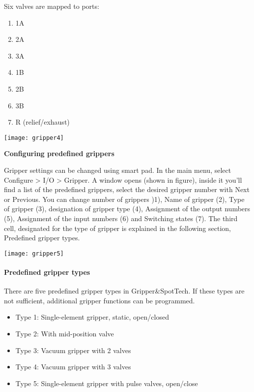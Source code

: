 	Six valves are mapped to ports:
 	\newline
 		\begin{minipage}{0.5\textwidth}
 			\begin{enumerate}
 				\item 1A
 				\item 2A
 				\item 3A
 				\item 1B
 				\item 2B
 				\item 3B
 				\item R (relief/exhaust) 
 			\end{enumerate}	
 	\end{minipage} \hfill
 	\begin{minipage}{0.5\textwidth}
 			\texttt{[image: gripper4]}
 	\end{minipage}
 
 	\newpage
	\textbf{Configuring predefined grippers}

	\bigskip

	\begin{minipage}{0.5\textwidth}
	Gripper settings can be changed using smart pad. In the main menu, select Configure > I/O > Gripper. A window opens (shown in figure), inside it you’ll find a list of the predefined grippers, select the desired gripper number with Next or Previous. 
	\newline
	You can change number of grippers )1), Name of gripper (2), Type of gripper (3), designation of gripper type (4), Assignment of the output numbers (5), Assignment of the input numbers (6) and Switching states (7). 
	\newline
	The third cell, designated for the type of gripper is explained in the following section, Predefined gripper types.
	\end{minipage} \hfill
	\begin{minipage}{0.6\textwidth}
		\texttt{[image: gripper5]}
	\end{minipage}
 		
 	\paragraph{Predefined gripper types}
 	There are five predefined gripper types in Gripper\&SpotTech. If these types are not sufficient, additional gripper functions can be programmed.
 		\begin{itemize}
 			\item Type 1: Single-element gripper, static, open/closed
 			\item Type 2: With mid-position valve
 			\item Type 3: Vacuum gripper with 2 valves
 			\item Type 4: Vacuum gripper with 3 valves
 			\item Type 5: Single-element gripper with pulse valves, open/close
 		\end{itemize}

